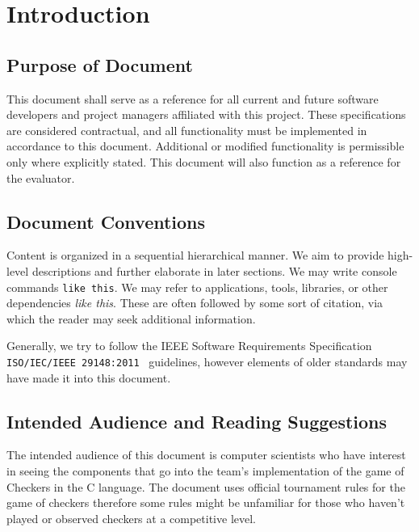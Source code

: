 \documentclass[letterpaper]{article}
\begin{document}

\section{Introduction}
\label{sec:intro}

\subsection{Purpose of Document}
\label{sec:intro_purpose}

This document shall serve as a reference for all current and
future software developers and project managers affiliated with
this project. These specifications are considered contractual,
and all functionality must be implemented in accordance to this
document. Additional or modified functionality is permissible
only where explicitly stated. This document will also function
as a reference for the evaluator.

\subsection{Document Conventions}
\label{sec:intro_conventions}

Content is organized in a sequential hierarchical manner. We
aim to provide high-level descriptions and further elaborate
in later sections. We may write console commands
\texttt{like this}. We may refer to applications, tools,
libraries, or other dependencies \emph{like this}. These are
often followed by some sort of citation, via which the reader
may seek additional information.

Generally, we try to follow the IEEE Software Requirements
Specification \texttt{ISO/IEC/IEEE 29148:2011}~\cite{ieeesrs}
guidelines, however elements of older standards may have made
it into this document.

\subsection{Intended Audience and Reading Suggestions}
\label{sec:intro_audience}

The intended audience of this document is computer scientists
who have interest  in seeing the components that go into the
team's implementation of the game of Checkers in the C
language. The document uses official tournament rules for the
game of checkers therefore some rules might be unfamiliar for
those who haven't played or observed checkers at a competitive
level.
\end{document}
